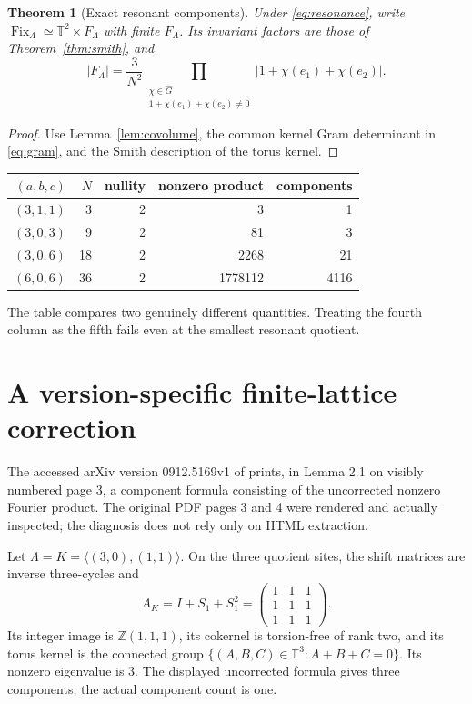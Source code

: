\documentclass[10pt]{article}
\newcommand{\T}{\mathbb T}
\newcommand{\Z}{\mathbb Z}
\newcommand{\Fix}{\operatorname{Fix}}
\newtheorem{theorem}{Theorem}
\begin{document}
\begin{theorem}[Exact resonant components]\label{thm:components}
Under \eqref{eq:resonance}, write
$\Fix_\Lambda\simeq\T^2\times F_\Lambda$ with finite $F_\Lambda$.
Its invariant factors are those of Theorem~\ref{thm:smith}, and
\begin{equation}\label{eq:components}
 |F_\Lambda|=\frac3{N^2}
 \prod_{\substack{\chi\in\widehat G\\1+\chi(e_1)+\chi(e_2)\ne0}}
 |1+\chi(e_1)+\chi(e_2)|.
\end{equation}
\end{theorem}
\begin{proof}
Use Lemma~\ref{lem:covolume}, the common kernel Gram determinant in
\eqref{eq:gram}, and the Smith description of the torus kernel.
\end{proof}

\begin{center}
\begin{tabular}{rrrrr}
\toprule
$(a,b,c)$ & $N$ & nullity & nonzero product & components\\
\midrule
$(3,1,1)$ & 3 & 2 & 3 & 1\\
$(3,0,3)$ & 9 & 2 & 81 & 3\\
$(3,0,6)$ & 18 & 2 & 2268 & 21\\
$(6,0,6)$ & 36 & 2 & 1778112 & 4116\\
\bottomrule
\end{tabular}
\end{center}
The table compares two genuinely different quantities. Treating the fourth
column as the fifth fails even at the smallest resonant quotient.

\section{A version-specific finite-lattice correction}\label{sec:correction}
The accessed arXiv version 0912.5169v1 of \cite{lsv} prints, in Lemma 2.1
on visibly numbered page 3, a component formula consisting of the uncorrected
nonzero Fourier product. The original PDF pages 3 and 4 were rendered and
actually inspected; the diagnosis does not rely only on HTML extraction.

Let $\Lambda=K=\langle(3,0),(1,1)\rangle$. On the three quotient sites,
the shift matrices are inverse three-cycles and
\begin{equation}\label{eq:minimal}
 A_K=I+S_1+S_1^2=
 \begin{pmatrix}1&1&1\\1&1&1\\1&1&1\end{pmatrix}.
\end{equation}
Its integer image is $\Z(1,1,1)$, its cokernel is torsion-free of rank two,
and its torus kernel is the connected group
$\{(A,B,C)\in\T^3:A+B+C=0\}$. Its nonzero eigenvalue is $3$.
The displayed uncorrected formula gives three components; the actual
component count is one.
\end{document}
